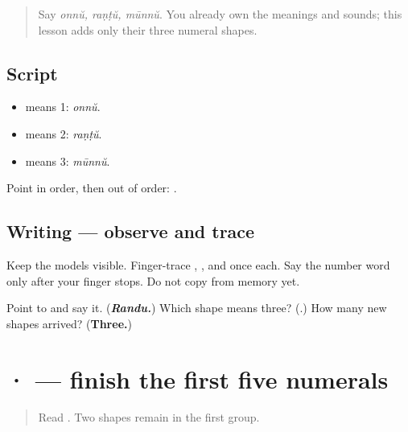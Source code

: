 \label{lesson:ML-W07-digits-1-3}



\begin{quote}
Say \emph{onnŭ, raṇṭŭ, mūnnŭ}. You already own the meanings and sounds; this lesson adds only their three numeral shapes.
\end{quote}

\subsection*{Script}
\begin{itemize}
\raggedright
  \item \textbf{} means 1: \emph{onnŭ}.
  \item \textbf{} means 2: \emph{raṇṭŭ}.
  \item \textbf{} means 3: \emph{mūnnŭ}.
\end{itemize}

Point in order, then out of order: \textbf{  }.

\subsection*{Writing — observe and trace}

Keep the models visible. Finger-trace \textbf{}, \textbf{}, and \textbf{} once each. Say the number word only after your finger stops. Do not copy from memory yet.

\begin{tcolorbox}[breakable,colback=teal!4,colframe=teal!35!black,title={Before you move on}]
Point to \textbf{} and say it. (\emph{\textbf{Randu.}}) Which shape means three? (\textbf{}.) How many new shapes arrived? (\textbf{Three.})
\end{tcolorbox}
\section[\texorpdfstring{\ml{൪} \ml{൫} (four, five)}{൪ ൫ (four, five)}]{ ·  — finish the first five numerals}

\label{lesson:ML-W07-digits-4-5}



\begin{quote}
Read \textbf{  }. Two shapes remain in the first group.
\end{quote}

